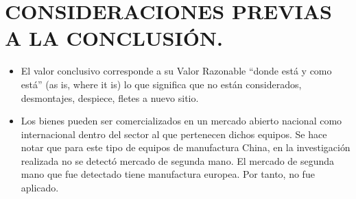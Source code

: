 
\chapter{CONSIDERACIONES PREVIAS A LA CONCLUSIÓN.} %
\begin{itemize}
	\item El valor conclusivo corresponde a su Valor Razonable ``donde está y como está'' (as is, where it is) lo que significa que no están considerados, desmontajes, despiece, fletes a nuevo sitio.
	\item Los bienes pueden ser comercializados en un mercado abierto nacional como internacional dentro del sector al que pertenecen dichos equipos.
		Se hace notar que para este tipo de equipos de manufactura China, en la investigación realizada no se detectó mercado de segunda mano.
		El mercado de segunda mano que fue detectado tiene manufactura europea.
		Por tanto, no fue aplicado.
\end{itemize}
\espacio
